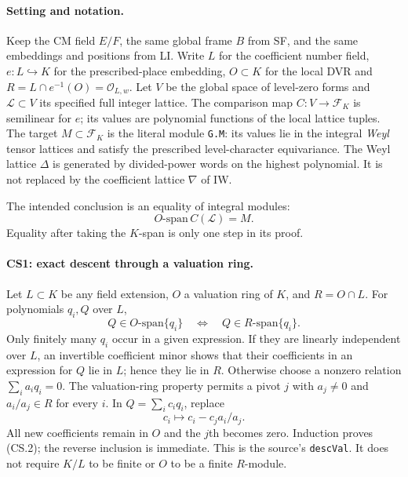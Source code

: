 \documentclass[11pt,a4paper]{article}
\numberwithin{equation}{section}
\theoremstyle{remark}\newtheorem{remark}[theorem]{Remark}
\begin{document}
\paragraph{Setting and notation.}
Keep the CM field $E/F$, the same global frame $B$ from SF, and the
same embeddings and positions from LI. Write $L$ for the coefficient
number field, $e:L\hookrightarrow K$ for the prescribed-place embedding,
$O\subset K$ for the local DVR and
$R=L\cap e^{-1}(O)=\mathcal O_{L,w}$.
Let $V$ be the global space of level-zero forms and
$\mathcal L\subset V$ its specified full integer lattice. The comparison
map $C:V\to\mathcal F_K$ is semilinear for $e$; its values are polynomial
functions of the local lattice tuples. The target $M\subset\mathcal F_K$
is the literal module \texttt{G.M}: its values lie in the integral
\emph{Weyl} tensor lattices and satisfy the prescribed level-character
equivariance. The Weyl lattice $\Delta$ is generated by divided-power
words on the highest polynomial. It is not replaced by the coefficient
lattice $\nabla$ of IW.

The intended conclusion is an equality of integral modules:
\[
 \boxed{\quad O\text{-span}\,C(\mathcal L)=M.\quad}       \tag{CS.1}
\]
Equality after taking the $K$-span is only one step in its proof.

\paragraph{CS1: exact descent through a valuation ring.}
Let $L\subset K$ be any field extension, $O$ a valuation ring of $K$,
and $R=O\cap L$. For polynomials $q_i,Q$ over $L$,
\[
 Q\in O\text{-span}\{q_i\}\quad\Longleftrightarrow\quad
 Q\in R\text{-span}\{q_i\}.                            \tag{CS.2}
\]
Only finitely many $q_i$ occur in a given expression. If they are
linearly independent over $L$, an invertible coefficient minor shows
that their coefficients in an expression for $Q$ lie in $L$; hence
they lie in $R$. Otherwise choose a nonzero relation
$\sum_i a_iq_i=0$. The valuation-ring property permits a pivot $j$
with $a_j\ne0$ and $a_i/a_j\in R$ for every $i$.
In $Q=\sum_i c_iq_i$, replace
\[
 c_i\longmapsto c_i-c_j a_i/a_j.
\]
All new coefficients remain in $O$ and the $j$th becomes zero.
Induction proves (CS.2); the reverse inclusion is immediate.
This is the source's \texttt{descVal}. It does not require $K/L$ to
be finite or $O$ to be a finite $R$-module.
\end{document}
